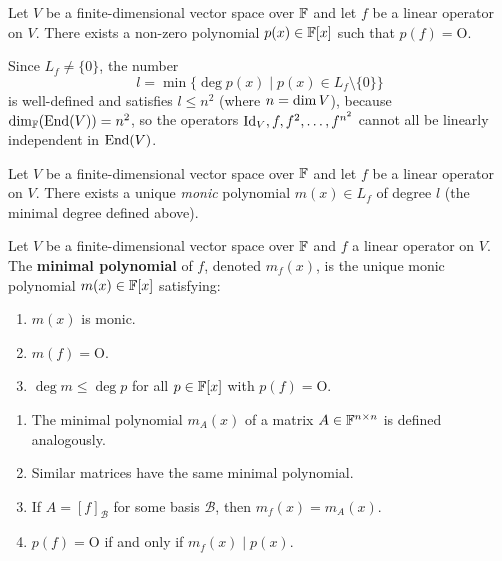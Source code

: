 \begin{thmbox}
\label{lem:annihilating-exists}
Let $V$ be a finite-dimensional vector space over $\mathbb{F}$ and let $f$ be a
linear operator on $V$.  There exists a non-zero polynomial
$p(x)\in\mathbb{F}[x]$ such that $p(f)=\mathrm{O}$.
\end{thmbox}

\begin{tipbox}
Since $L_f\neq\{0\}$, the number
\[
    l = \min\{\deg p(x) \mid p(x)\in L_f\setminus\{0\}\}
\]
is well-defined and satisfies $l\le n^2$ (where $n=\operatorname{dim} V$), because
$\operatorname{dim}_{\mathbb{F}}(\operatorname{End}(V))=n^2$, so the operators
$\mathrm{Id}_V, f, f^2,\ldots,f^{n^2}$ cannot all be linearly independent in $\operatorname{End}(V)$.
\end{tipbox}

\begin{propbox}
\label{prop:minimal-poly-unique}
Let $V$ be a finite-dimensional vector space over $\mathbb{F}$ and let $f$ be a
linear operator on $V$.  There exists a unique \emph{monic} polynomial
$m(x)\in L_f$ of degree $l$ (the minimal degree defined above).
\end{propbox}

\begin{defbox}
\label{def:minimal-poly}
Let $V$ be a finite-dimensional vector space over $\mathbb{F}$ and $f$ a linear
operator on $V$.  The \textbf{minimal polynomial} of $f$, denoted
$m_f(x)$, is the unique monic polynomial $m(x)\in\mathbb{F}[x]$ satisfying:
\begin{enumerate}[label=\textbf{(\roman*)}]
    \item $m(x)$ is monic.
    \item $m(f)=\mathrm{O}$.
    \item $\deg m\le\deg p$ for all $p\in\mathbb{F}[x]$ with $p(f)=\mathrm{O}$.
\end{enumerate}
\end{defbox}

\begin{tipbox}
\label{rem:min-poly-props}
\begin{enumerate}[label=\textbf{(\arabic*)}]
    \item The minimal polynomial $m_A(x)$ of a matrix $A\in\mathbb{F}^{n\times n}$
          is defined analogously.
    \item Similar matrices have the same minimal polynomial.
    \item If $A=[f]_{\mathcal{B}}$ for some basis $\mathcal{B}$, then
          $m_f(x)=m_A(x)$.
    \item $p(f)=\mathrm{O}$ if and only if $m_f(x)\mid p(x)$.
\end{enumerate}
\end{tipbox}

